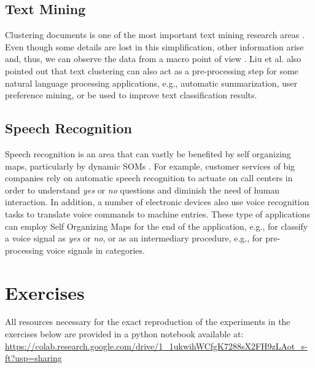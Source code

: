 \subsection{Text Mining}

Clustering documents is one of the most important text mining research areas \cite{txtmin1}\cite{txtmin2}\cite{txtmin3}. Even though some details are lost in this simplification, other information arise and, thus, we can observe the data from a macro point of view \cite{Liu12}. Liu et al. \cite{Liu12} also pointed out that text clustering can also act as a pre-processing step for some natural language processing applications, e.g., automatic summarization, user preference mining, or be used to improve text classification results. 

\subsection{Speech Recognition}

Speech recognition is an area that can vastly be benefited by self organizing maps, particularly by dynamic SOMs \cite{sp1}\cite{sp2}\cite{sp3}. For example, customer services of big companies rely on automatic speech recognition to actuate on call centers in order to understand \textit{yes} or \textit{no} questions and diminish the need of human interaction. In addition, a number of electronic devices also use voice recognition tasks to translate voice commands to machine entries. These type of applications can employ Self Organizing Maps for the end of the application, e.g., for classify a voice signal as \textit{yes} or \textit{no}, or as an intermediary procedure, e.g., for pre-processing voice signals in categories. 


\section{Exercises}

All resources necessary for the exact reproduction of the experiments in the exercises below are provided in a python notebook available at: \url{https://colab.research.google.com/drive/1_1ukwihWCfgK7288sX2FH9zLAot_s-ft?usp=sharing} 

